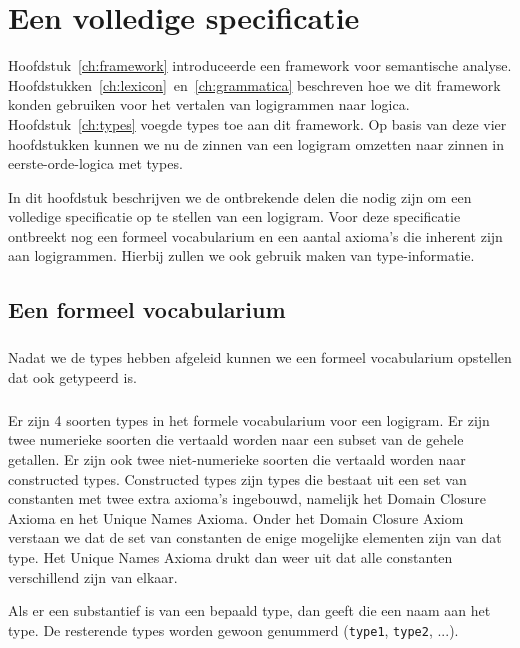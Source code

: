 \chapter{Een volledige specificatie}
\label{ch:specificatie}

Hoofdstuk~\ref{ch:framework} introduceerde een framework voor semantische analyse. Hoofdstukken~\ref{ch:lexicon}~en~\ref{ch:grammatica} beschreven hoe we dit framework konden gebruiken voor het vertalen van logigrammen naar logica. Hoofdstuk~\ref{ch:types} voegde types toe aan dit framework. Op basis van deze vier hoofdstukken kunnen we nu de zinnen van een logigram omzetten naar zinnen in eerste-orde-logica met types.

In dit hoofdstuk beschrijven we de ontbrekende delen die nodig zijn om een volledige specificatie op te stellen van een logigram. Voor deze specificatie ontbreekt nog een formeel vocabularium en een aantal axioma's die inherent zijn aan logigrammen. Hierbij zullen we ook gebruik maken van type-informatie.

\section{Een formeel vocabularium}
\label{sec:vocabularium}
\paragraph{} Nadat we de types hebben afgeleid kunnen we een formeel vocabularium opstellen dat ook getypeerd is.

\paragraph{}Er zijn 4 soorten types in het formele vocabularium voor een logigram. Er zijn twee numerieke soorten die vertaald worden naar een subset van de gehele getallen. Er zijn ook twee niet-numerieke soorten die vertaald worden naar constructed types. Constructed types zijn types die bestaat uit een set van constanten met twee extra axioma's ingebouwd, namelijk het Domain Closure Axioma en het Unique Names Axioma. Onder het Domain Closure Axiom verstaan we dat de set van constanten de enige mogelijke elementen zijn van dat type. Het Unique Names Axioma drukt dan weer uit dat alle constanten verschillend zijn van elkaar.

Als er een substantief is van een bepaald type, dan geeft die een naam aan het type. De resterende types worden gewoon genummerd (\texttt{type1}, \texttt{type2}, ...).

